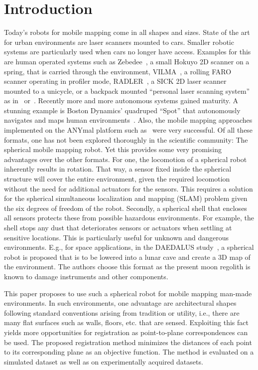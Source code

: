 \section{Introduction}

Today's robots for mobile mapping come in all shapes and sizes.
State of the art for urban environments are laser scanners mounted to cars.
Smaller robotic systems are particularly used when cars no longer have access.
Examples for this are human operated systems such as Zebedee~\cite{Bosse2012-zebedee}, a small Hokuyo 2D scanner on a spring, that is carried through the environment, VILMA~\cite{JPRS2016}, a rolling FARO scanner operating in profiler mode, RADLER~\cite{Borrmann2020-RADLER}, a SICK 2D laser scanner mounted to a unicycle, or a backpack mounted ``personal laser scanning system'' as in~\cite{LauterbackEtAl2015-Backpack} or~\cite{WWWLeicaBackpack}.
Recently more and more autonomous systems gained maturity.
A stunning example is Boston Dynamics' quadruped ``Spot'' that autonomously navigates and maps human environments~\cite{SpotRobot}.
Also, the mobile mapping approaches implemented on the ANYmal platform such as~\cite{Fankhauser2018-ANYmal} were very successful.
Of all these formats, one has not been explored thoroughly in the scientific community: The spherical mobile mapping robot.
Yet this provides some very promising advantages over the other formats.
For one, the locomotion of a spherical robot inherently results in rotation.
That way, a sensor fixed inside the spherical structure will cover the entire environment, given the required locomotion without the need for additional actuators for the sensors.
This requires a solution for the spherical simultaneous localization and mapping (SLAM) problem given the six degrees of freedom of the robot.
Secondly, a spherical shell that encloses all sensors protects these from possible hazardous environments.
For example, the shell stops any dust that deteriorates sensors or actuators when settling at sensitive locations.
This is particularly useful for unknown and dangerous environments.
E.g., for space applications, in the DAEDALUS study~\cite{RossiMaurelliUnnithanetal.2021}, a spherical robot is proposed that is to be lowered into a lunar cave and create a 3D map of the environment. The authors choose this format as the present moon regolith is known to damage instruments and other components.

This paper proposes to use such a spherical robot for mobile mapping man-made environments.
In such environments, one advantage are architectural shapes following standard conventions arising from tradition or utility, i.e., there are many flat surfaces such as walls, floors, etc. that are sensed.
Exploiting this fact yields more opportunities for registration as point-to-plane correspondences can be used.
The proposed registration method minimizes the distances of each point to its corresponding plane as an objective function.
The method is evaluated on a simulated dataset as well as on experimentally acquired datasets.
